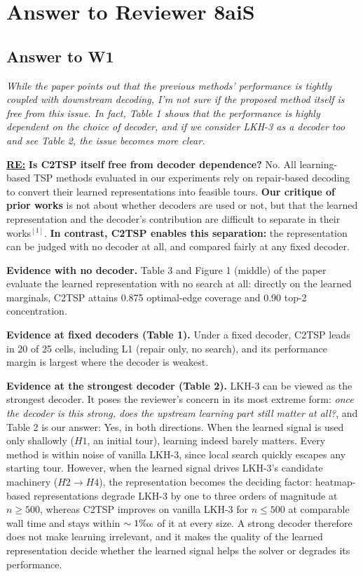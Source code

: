 \section{Answer to Reviewer 8aiS}


\subsection{Answer to W1}

\textit{While the paper points out that the previous methods' performance is tightly coupled with downstream decoding, I'm not sure if the proposed method itself is free from this issue. In fact, Table 1 shows that the performance is highly dependent on the choice of decoder, and if we consider LKH-3 as a decoder too and see Table 2, the issue becomes more clear.}

\textbf{\underline{RE:}}
\textbf{Is C2TSP itself free from decoder dependence?} No. 
All learning-based TSP methods evaluated in our experiments rely on repair-based decoding to convert their learned representations into feasible tours. \textbf{Our critique of prior works} is not about whether decoders are used or not, but that the learned representation and the decoder's contribution are difficult to separate in their works$^{[1]}$. \textbf{In contrast, C2TSP enables this separation:} the representation can be judged with no decoder at all, and compared fairly at any fixed decoder.

\textbf{Evidence with no decoder.} Table 3 and Figure 1 (middle) of the paper evaluate the learned representation with no search at all: directly on the learned marginals, C2TSP attains 0.875 optimal-edge coverage and 0.90 top-2 concentration.

\textbf{Evidence at fixed decoders (Table 1).} Under a fixed decoder, C2TSP leads in 20 of 25 cells, including L1 (repair only, no search), and its performance margin is largest where the decoder is weakest.

\textbf{Evidence at the strongest decoder (Table 2).} LKH-3 can be viewed as the strongest decoder. It poses the reviewer's concern in its most extreme form: \emph{once the decoder is this strong, does the upstream learning part still matter at all?}, and Table 2 is our answer: Yes, in both directions. When the learned signal is used only shallowly ($H1$, an initial tour), learning indeed barely matters. Every method is within noise of vanilla LKH-3, since local search quickly escapes any starting tour. However, when the learned signal drives LKH-3's candidate machinery ($H2 \rightarrow H4$), the representation becomes the deciding factor: heatmap-based representations degrade LKH-3 by one to three orders of magnitude at $n\geq500$, whereas C2TSP improves on vanilla LKH-3 for $n\leq 500$ at comparable wall time and stays within $\sim 1\text{\textpertenthousand}$ of it at every size. A strong decoder therefore does not make learning irrelevant, and it makes the quality of the learned representation decide whether the learned signal helps the solver or degrades its performance. 

